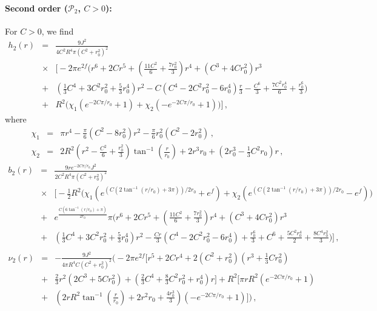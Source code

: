 \documentclass[aps,prd,12pt,superscriptaddress]{revtex4-2}
\begin{document}
\paragraph{Second order ($\mathcal{P}_2$, $C > 0$):} 
For $C>0$, we find
\begin{eqnarray}
h_2(r) &=& \frac{9J^2}{4C^2
R^4\pi(C^2 + r_0^2)^2} \nonumber \\
& \times& \Big[ -2\pi e^{2f} 
\Big( r^6 + 2Cr^5 + ( \frac{11C^2}{6} + \frac{7r_0^2}{3} )r^4 + \left( C^3 + 4Cr_0^2 \right)r^3 
\nonumber \\
&+& ( \frac{1}{3}C^4 + 3C^2r_0^2 + \frac{5}{3}r_0^4 )r^2  
- C \left( C^4 - 2C^2r_0^2 - 6r_0^4 \right)\frac{r}{3} - \frac{C^6}{3} + \frac{7C^2r_0^4}{6} + \frac{r_0^6}{3} \Big) 
\nonumber \\
& +& R^2 \Big(
\chi_1 (e^{-2C\pi/r_0}+1)
    + \chi_2(-e^{-2C\pi/r_0}+1)
\Big)
 \Big] \, ,
\end{eqnarray}
where
\begin{eqnarray}
    \chi_1 &=&  \pi r^4 
    - \frac{\pi}{6}(C^2 - 8r_0^2)r^2
    - \frac{\pi}{6}r_0^2(C^2 - 2r_0^2) \, ,
    \\
    \chi_2 &=&
    2 R^2 (r^2 - \frac{C^2}{6} + \frac{r_0^2}{3})\tan^{-1}(\frac{r}{r_0})
    + 2r^3r_0 + (2r_0^3 - \frac{1}{3}C^2r_0)r \, ,
\end{eqnarray}
\begin{eqnarray}
b_2(r) &=& \frac{9re^{-2C\pi/r_0}J^2}{2C^2 R^4 \pi(C^2 + r_0^2)^2} \nonumber \\
&\times& \Big[
-\frac{1}{2} R^2
 \Big( 
 \chi_1
    ( e^{\left(C(2\tan^{-1}(r/r_0) + 3\pi)\right)/2r_0}
    + e^f)
+
\chi_2
     ( e^{\left(C(2\tan^{-1}(r/r_0) + 3\pi)\right)/2r_0}
    - e^f)
    \Big)
\nonumber\\
&+& 
e^{\frac{C(6\tan^{-1}(r/r_0) + \pi)}{2r_0}}\pi
\big( r^6 + 2Cr^5 + (\frac{11C^2}{6} + \frac{7r_0^2}{3})r^4 + (C^3 + 4Cr_0^2)r^3 
\nonumber\\
&+& (\frac{1}{3}C^4 + 3C^2r_0^2 + \frac{5}{3}r_0^4)r^2 
- \frac{Cr}{3}
(C^4 - 2C^2r_0^2 - 6r_0^4) 
+ \frac{r_0^6}{3} + C^6 + \frac{5C^2r_0^4}{2} + \frac{8C^4r_0^2}{3} \big)
 \Big] \, , 
 \nonumber  \\
\end{eqnarray}
\begin{eqnarray}
\nu_2(r) &=&
-\frac{9J^2}{4\pi
R^4 C(C^2 + r_0^2)^2}
\Big(-2 \pi e^{2f} 
\Big[ r^5 + 2Cr^4 + 
2\left(C^2 + r_0^2\right)
(r^3
+ \frac{1}{3} Cr_0^2)
\nonumber\\
&+& \frac{2}{3}r^2 \left(2C^3 + 5 Cr_0^2\right) 
+
\left(\frac{2}{3}C^4 + \frac{8}{3}C^2r_0^2 + r_0^4\right)r 
\Big]
+
R^2 
\Big[
 \pi r R^2 
(e^{-2C\pi/r_0} +1)
\nonumber \\
&+& 
(2rR^2
\tan^{-1}\left(\frac{r}{r_0}\right) 
+ 2r^2r_0 + \frac{4r_0^3}{3} )
(-e^{-2C\pi/r_0} +1)
\Big]
\Big)\, ,
\end{eqnarray}
\end{document}
